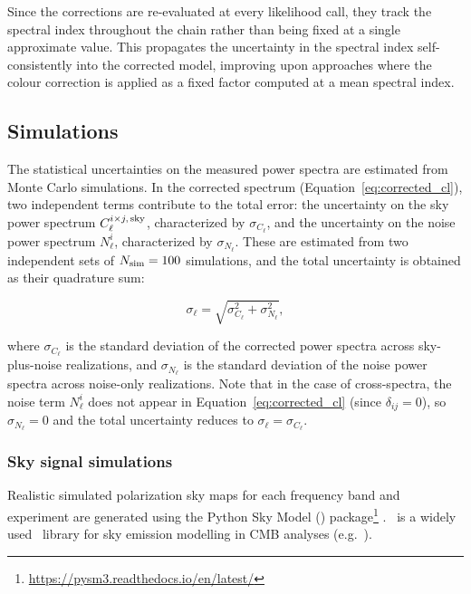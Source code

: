 Since the corrections are re-evaluated at every likelihood call, they track the spectral index throughout the chain rather than being fixed at a single approximate value. This propagates the uncertainty in the spectral index self-consistently into the corrected model, improving upon approaches where the colour correction is applied as a fixed factor computed at a mean spectral index.

\subsection{Simulations}
\label{sec:simulations}

The statistical uncertainties on the measured power spectra are estimated from Monte Carlo simulations. In the corrected spectrum (Equation~\ref{eq:corrected_cl}), two independent terms contribute to the total error: the uncertainty on the sky power spectrum $C_\ell^{i \times j,\,\rm sky}$, characterized by $\sigma_{C_\ell}$, and the uncertainty on the noise power spectrum $N_\ell^i$, characterized by $\sigma_{N_\ell}$. These are estimated from two independent sets of $N_{\rm sim} = 100$ simulations, and the total uncertainty is obtained as their quadrature sum:

\begin{equation}
    \sigma_\ell = \sqrt{\sigma_{C_\ell}^{2} + \sigma_{N_\ell}^{2}},
\end{equation}

where $\sigma_{C_\ell}$ is the standard deviation of the corrected power spectra across sky-plus-noise realizations, and $\sigma_{N_\ell}$ is the standard deviation of the noise power spectra across noise-only realizations. Note that in the case of cross-spectra, the noise term $N_\ell^i$ does not appear in Equation~\ref{eq:corrected_cl} (since $\delta_{ij} = 0$), so $\sigma_{N_\ell} = 0$ and the total uncertainty reduces to $\sigma_\ell = \sigma_{C_\ell}$.

\subsubsection{Sky signal simulations}
\label{sec:sky_simulations}

Realistic simulated polarization sky maps for each frequency band and experiment are generated using the Python Sky Model (\pysm) package\footnote{\url{https://pysm3.readthedocs.io/en/latest/}} \citep{Pysm}. \pysm\ is a widely used \python\ library for sky emission modelling in CMB analyses (e.g.\ \citealt{Planck_2020LVII, Martire_2022}).


